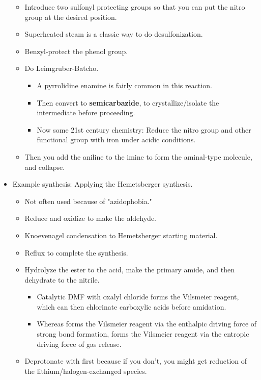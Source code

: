 \documentclass[../notes.tex]{subfiles}
\begin{document}
\begin{itemize}
    \begin{itemize}
        \item Introduce two sulfonyl protecting groups so that you can put the nitro group at the desired position.
        \item Superheated steam is a classic way to do desulfonization.
        \item Benzyl-protect the phenol group.
        \item Do Leimgruber-Batcho.
        \begin{itemize}
            \item A pyrrolidine enamine is fairly common in this reaction.
            \item Then convert to \textbf{semicarbazide}, to crystallize/isolate the intermediate before proceeding.
            \item Now some 21st century chemistry: Reduce the nitro group and other functional group with iron under acidic conditions.
        \end{itemize}
        \item Then you add the aniline to the imine to form the aminal-type molecule, and collapse.
    \end{itemize}
    \item Example synthesis: Applying the Hemetsberger synthesis.
    \begin{itemize}
        \item Not often used because of "azidophobia."
        \item Reduce and oxidize to make the aldehyde.
        \item Knoevenagel condensation to Hemetsberger starting material.
        \item Reflux to complete the synthesis.
        \item Hydrolyze the ester to the acid, make the primary amide, and then dehydrate to the nitrile.
        \begin{itemize}
            \item Catalytic DMF with oxalyl chloride forms the Vilsmeier reagent, which can then chlorinate carboxylic acids before amidation.
            \item Whereas  forms the Vilsmeier reagent via the enthalpic driving force of strong  bond formation,  forms the Vilsmeier reagent via the entropic driving force of  gas release.
        \end{itemize}
        \item Deprotonate with  first because if you don't, you might get reduction of the lithium/halogen-exchanged species.

\end{itemize}
\end{itemize}
\end{document}
